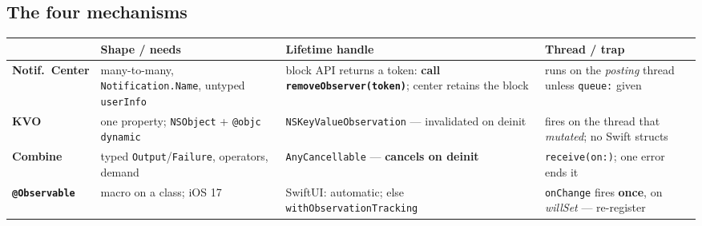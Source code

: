 \documentclass[8pt]{extarticle}
\begin{document}
\begin{multicols}{2}
\raggedright

\section{The four mechanisms}
{\scriptsize
\begin{tabular}{@{}>{\raggedright\arraybackslash}p{11mm}>{\raggedright\arraybackslash}p{18mm}>{\raggedright\arraybackslash}p{19mm}>{\raggedright\arraybackslash}p{21mm}@{}}
\toprule
 & \textbf{Shape / needs} & \textbf{Lifetime handle} & \textbf{Thread / trap} \\
\midrule
\textbf{Notif.\ Center} & many-to-many, \texttt{Notification.Name}, untyped \texttt{userInfo} & block API returns a token: \textbf{call \texttt{removeObserver(token)}}; center retains the block & runs on the \emph{posting} thread unless \texttt{queue:} given \\
\textbf{KVO} & one property; \texttt{NSObject} + \texttt{@objc dynamic} & \texttt{NSKeyValueObservation} — invalidated on deinit & fires on the thread that \emph{mutated}; no Swift structs \\
\textbf{Combine} & typed \texttt{Output}/\texttt{Failure}, operators, demand & \texttt{AnyCancellable} — \textbf{cancels on deinit} & \texttt{receive(on:)}; one error ends it \\
\textbf{\texttt{@Observable}} & macro on a class; iOS 17 & SwiftUI: automatic; else \texttt{withObservationTracking} & \texttt{onChange} fires \textbf{once}, on \emph{willSet} — re-register \\
\bottomrule
\end{tabular}}


\end{multicols}
\end{document}
